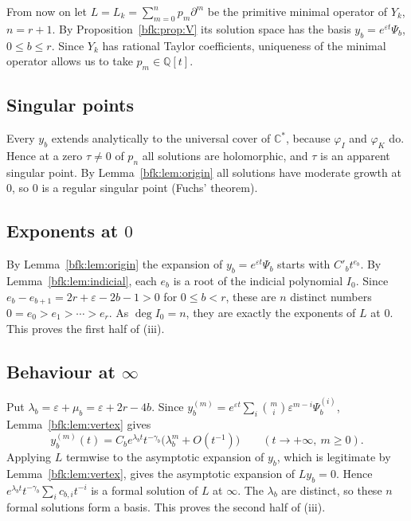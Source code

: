 \documentclass[11pt,a4paper]{article}
\theoremstyle{definition}
\theoremstyle{remark}
\numberwithin{equation}{section}
\newcommand{\C}{\mathbb{C}}
\newcommand{\Q}{\mathbb{Q}}
\begin{document}
From now on let $L=L_k=\sum_{m=0}^np_m\partial^m$ be the primitive minimal operator of $Y_k$, $n=r+1$. By Proposition~\ref{bfk:prop:V} its solution space has the basis $y_b=e^{\varepsilon t}\Psi_b$, $0\le b\le r$. Since $Y_k$ has rational Taylor coefficients, uniqueness of the minimal operator allows us to take $p_m\in\Q[t]$.

\subsection{Singular points}
Every $y_b$ extends analytically to the universal cover of $\C^*$, because $\varphi_I$ and $\varphi_K$ do. Hence at a zero $\tau\ne0$ of $p_n$ all solutions are holomorphic, and $\tau$ is an apparent singular point. By Lemma~\ref{bfk:lem:origin} all solutions have moderate growth at $0$, so $0$ is a regular singular point (Fuchs' theorem).

\subsection{Exponents at \texorpdfstring{$0$}{0}}
By Lemma~\ref{bfk:lem:origin} the expansion of $y_b=e^{\varepsilon t}\Psi_b$ starts with $C'_bt^{e_b}$. By Lemma~\ref{bfk:lem:indicial}, each $e_b$ is a root of the indicial polynomial $I_0$. Since $e_b-e_{b+1}=2r+\varepsilon-2b-1>0$ for $0\le b<r$, these are $n$ distinct numbers $0=e_0>e_1>\cdots>e_r$. As $\deg I_0=n$, they are exactly the exponents of $L$ at $0$. This proves the first half of (iii).

\subsection{Behaviour at \texorpdfstring{$\infty$}{infinity}}
Put $\lambda_b=\varepsilon+\mu_b=\varepsilon+2r-4b$. Since $y_b^{(m)}=e^{\varepsilon t}\sum_i\binom mi\varepsilon^{m-i}\Psi_b^{(i)}$, Lemma~\ref{bfk:lem:vertex} gives
\begin{equation}\label{bfk:eq:yinf}
y_b^{(m)}(t)=C_be^{\lambda_bt}t^{-\gamma_b}\bigl(\lambda_b^m+O(t^{-1})\bigr)\qquad(t\to+\infty,\ m\ge0).
\end{equation}
Applying $L$ termwise to the asymptotic expansion of $y_b$, which is legitimate by Lemma~\ref{bfk:lem:vertex}, gives the asymptotic expansion of $Ly_b=0$. Hence $e^{\lambda_bt}t^{-\gamma_b}\sum_ic_{b,i}t^{-i}$ is a formal solution of $L$ at $\infty$. The $\lambda_b$ are distinct, so these $n$ formal solutions form a basis. This proves the second half of (iii).
\end{document}
